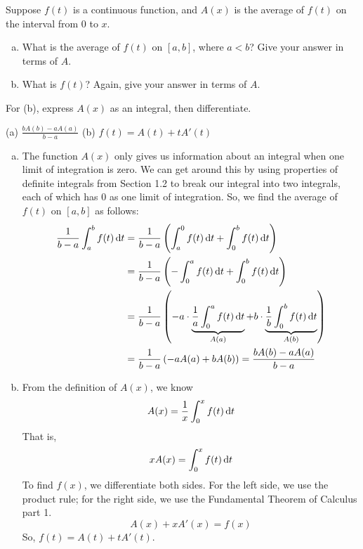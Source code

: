 \begin{question}
Suppose $f(t)$ is a continuous function, and
$A(x)$ is the average of $f(t)$ on the interval from 0 to $x$.
\begin{enumerate}[(a)]
\item What is the average of $f(t)$ on $[a,b]$, where $a<b$? Give your answer in terms of $A$.
\item What is $f(t)$? Again, give your answer in terms of $A$.
\end{enumerate}
\end{question}
\begin{hint}
For (b), express $A(x)$ as an integral, then differentiate.
\end{hint}
\begin{answer}
(a) $\displaystyle\frac{bA(b) - aA(a)}{b-a}$
\qquad
(b) $f(t)=A(t)+tA'(t) $
\end{answer}
\begin{solution}
\begin{enumerate}[(a)]
\item  The function $A(x)$ only gives us information about an integral when one limit of integration is zero. We can get around this by using properties of definite integrals from Section 1.2 to break our integral into two integrals, each of which has 0 as one limit of integration. So, we find the average of $f(t)$ on $[a,b]$ as follows:
\begin{align*}
\frac{1}{b-a}\int_a^b f(t)\,\mathrm{d}t&=
\frac{1}{b-a}\left(\int_a^0 f(t)\,\mathrm{d}t + \int_0^b f(t)\,\mathrm{d}t\right)\\
&=\frac{1}{b-a}\left(-\int_0^a f(t)\,\mathrm{d}t + \int_0^b f(t)\,\mathrm{d}t \right)\\
&=\frac{1}{b-a}\left(-a\cdot\underbrace{\frac{1}{a}\int_0^a f(t)\,\mathrm{d}t}_{A(a)} + b\cdot\underbrace{\frac{1}{b}\int_0^b f(t)\,\mathrm{d}t}_{A(b)} \right)\\
&=\frac{1}{b-a}\left(-aA(a)+bA(b) \right) = \frac{bA(b) - aA(a)}{b-a}
\end{align*}
\item From the definition of $A(x)$, we know
\[A(x) = \frac{1}{x}\int_0^x f(t)\,\mathrm{d}t\]
That is,
\[xA(x) =\int_0^x f(t)\,\mathrm{d}t\]
To find $f(x)$, we differentiate both sides. For the left side, we use the product rule; for the right side, we use the Fundamental Theorem of Calculus part 1.
\[A(x)+xA'(x) = f(x)\]
So, $f(t)=A(t)+tA'(t)$.
\end{enumerate}
\end{solution}

